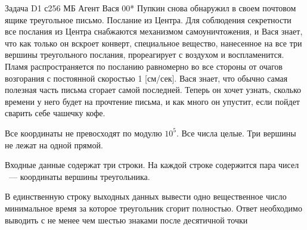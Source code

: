 \begin{problem}{Задача D}{1 с}{256 МБ}
Агент Вася 00* Пупкин снова обнаружил в своем почтовом ящике треугольное
письмо. Послание из Центра. Для соблюдения секретности все послания из Центра
снабжаются механизмом самоуничтожения, и Вася знает, что как только он вскроет
конверт, специальное вещество, нанесенное на все три вершины треугольного послания,
прореагирует с воздухом и воспламенится.
Пламя распространяется по посланию равномерно во все стороны от очагов
возгорания с постоянной скоростью 1 [см/сек]. Вася знает, что обычно самая полезная
часть письма сгорает самой последней. Теперь он хочет узнать, сколько времени у него
будет на прочтение письма, и как много он упустит, если пойдет сварить себе чашечку
кофе.\\
\Limit

Все координаты не превосходят по модулю $10^5$.
Все числа целые.
Три вершины не лежат на одной прямой.

\InputFile
Входные данные содержат три строки. На каждой строке содержится пара чисел
~--- координаты вершины треугольника.

\OutputFile
В единственную строку выходных данных вывести одно вещественное число
минимальное время за которое треугольник сгорит полностью. Ответ необходимо
выводить с не менее чем шестью знаками после десятичной точки

\Example
\begin{example}
\end{example}
\end{problem}
